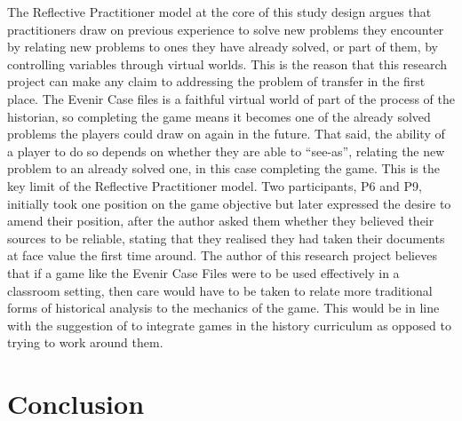 \documentclass{l4proj}
\begin{document}
The Reflective Practitioner model at the core of this study design argues that practitioners draw on previous experience to solve new problems they encounter by relating new problems to ones they have already solved, or part of them, by controlling variables through virtual worlds. This is the reason that this research project can make any claim to addressing the problem of transfer in the first place. The Evenir Case files is a faithful virtual world of part of the process of the historian, so completing the game means it becomes one of the already solved problems the players could draw on again in the future. That said, the ability of a player to do so depends on whether they are able to “see-as”, relating the new problem to an already solved one, in this case completing the game. This is the key limit of the Reflective Practitioner model. Two participants, P6 and P9, initially took one position on the game objective but later expressed the desire to amend their position, after the author asked them whether they believed their sources to be reliable, stating that they realised they had taken their documents at face value the first time around. The author of this research project believes that if a game like the Evenir Case Files were to be used effectively in a classroom setting, then care would have to be taken to relate more traditional forms of historical analysis to the mechanics of the game. This would be in line with the suggestion of \citet{mccall2016teaching} to integrate games in the history curriculum as opposed to trying to work around them. 

\chapter{Conclusion}
\end{document}
